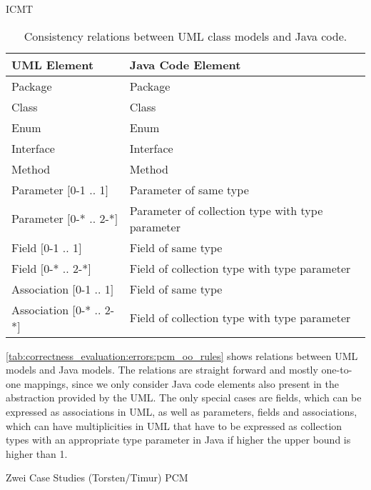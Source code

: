 \begin{copiedFrom}{ICMT}
\begin{table}
	\centering 
    \small
    \renewcommand{\arraystretch}{1.4}
	\begin{tabular}{p{3cm} p{7cm}}
		\toprule
        \textbf{\gls{UML} Element}  & \textbf{Java Code Element} \\
        \midrule
        Package            & Package\\
		Class            & Class\\
		Enum		& Enum \\
		Interface		   	    & Interface \\
        Method & Method \\
        Parameter $[$0-1 .. 1$]$ & Parameter of same type \\
        Parameter $[$0-* .. 2-*$]$ & Parameter of collection type with type parameter \\
        Field $[$0-1 .. 1$]$     & Field of same type\\
        Field $[$0-* .. 2-*$]$     & Field of collection type with type parameter\\
        Association $[$0-1 .. 1$]$   & Field of same type\\
        Association $[$0-* .. 2-*$]$   & Field of collection type with type parameter\\
		\bottomrule
	\end{tabular}
	\caption[Consistency relation between UML and Java]{Consistency relations between \gls{UML} class models and Java code.}
	\label{tab:correctness_evaluation:errors:uml_java_rules}
\end{table}

\autoref{tab:correctness_evaluation:errors:pcm_oo_rules} shows relations between \gls{UML} models and Java models.
The relations are straight forward and mostly one-to-one mappings, since we only consider Java code elements also present in the abstraction provided by the \gls{UML}.
The only special cases are fields, which can be expressed as associations in \gls{UML}, as well as parameters, fields and associations, which can have multiplicities in \gls{UML} that have to be expressed as collection types with an appropriate type parameter in Java if higher the upper bound is higher than 1.


Zwei Case Studies (Torsten/Timur)
\gls{PCM}


\end{copiedFrom}
